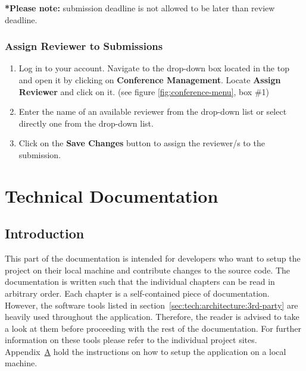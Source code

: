 \documentclass[nochapterpage,nopartpage,noheadingspace,numbersubsubsec,bigchapter,colorback,accentcolor=tud9c,10pt]{tudreport}
\begin{document}
    \textbf{*Please note:} submission deadline is not allowed to be later than review deadline.

  \section{Assign Reviewer to Submissions}
        \begin{enumerate}
            \item   Log in to your account. Navigate to the drop-down box located in the top and open it by clicking on \textbf{Conference Management}. Locate \textbf{Assign Reviewer} and click on it. (see figure \ref{fig:conference-menu}, box \#1)
            \item   Enter the name of an available reviewer from the drop-down list or select directly one from the drop-down list.
            \item   Click on the \textbf{Save Changes} button to assign the reviewer/s to the submission.
        \end{enumerate}

\part{Technical Documentation}
\label{part:tech}

  \chapter{Introduction}
  \label{ch:tech:intro}

    This part of the documentation is intended for developers who want to setup the project on their local machine and contribute changes to the source code. The documentation is written such that the individual chapters can be read in arbitrary order. Each chapter is a self-contained piece of documentation. However, the software tools listed in section~\ref{sec:tech:architecture:3rd-party} are heavily used throughout the application. Therefore, the reader is advised to take a look at them before proceeding with the rest of the documentation. For further information on these tools please refer to the individual project sites. Appendix~\hyperref[ch:appendix:setup]{A} hold the instructions on how to setup the application on a local machine.
\end{document}
